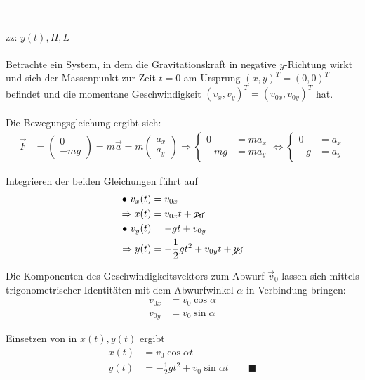 \documentclass{article}
\begin{document}
{\color{violet}
\hrule
	\\
	zz: $y(t), H, L$\\
	\\
	Betrachte ein System, in dem die Gravitationskraft in negative $y$-Richtung wirkt und sich der Massenpunkt zur Zeit $t=0$ am Ursprung $(x,y)^T=(0,0)^T$ befindet und die momentane Geschwindigkeit $(v_x, v_y)^T = (v_{0x},v_{0y})^T$ hat.\\
	\\
	Die Bewegungsgleichung ergibt sich:
		\begin{align*}
			\vec{F} &=
			\begin{pmatrix}
				0\\ -mg
			\end{pmatrix}
			=
			m\vec{a}
			=
			m
			\begin{pmatrix}
				a_x\\ a_y
			\end{pmatrix}
			\Rightarrow
			\begin{cases}
				0 &= m a_x \\
				-mg &= m a_y
			\end{cases}
			\Leftrightarrow
			\begin{cases}
				0 &= a_x \\
				-g &= a_y
			\end{cases}
		\end{align*}

	Integrieren der beiden Gleichungen führt auf
		\begin{align*}
			\bullet \ v_x(t) &= v_{0x} \\
			\Rightarrow x(t) &= v_{0x}t + \cancel{x_0} \\
			\bullet \ v_y(t) &= -g t + v_{0y} \\
			\Rightarrow y(t) &= -\frac{1}{2}gt^2 + v_{0y}t + \cancel{y_0}
		\end{align*}

	Die Komponenten des Geschwindigkeitsvektors zum Abwurf $\vec{v}_0$ lassen sich mittels trigonometrischer Identitäten mit dem Abwurfwinkel $\alpha$ in Verbindung bringen:
		\begin{align*}
			v_{0x} &= v_0 \cos\alpha \\
			v_{0y} &= v_0 \sin\alpha
		\end{align*}
	
	Einsetzen von in $x(t), y(t)$ ergibt
		\begin{align*}
			x(t) &= v_0\cos\alpha t \\
			y(t) &= -\frac{1}{2}gt^2 + v_0 \sin\alpha t \qquad\blacksquare
		\end{align*}
	
}
\end{document}
